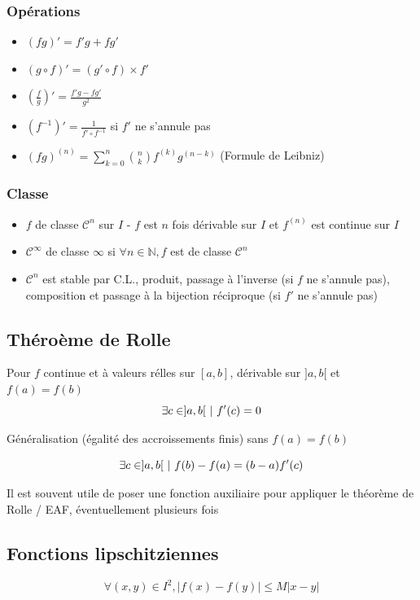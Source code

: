 \documentclass[openany]{book}
\begin{document}
\subsubsection{Opérations}
\begin{itemize}
    \item $ (fg)' = f'g + fg' $
    \item $ (g \circ f)' = (g' \circ f) \times f' $
    \item $ (\frac{f}{g})' = \frac{f'g - fg'}{g^2} $
    \item $ (f^{-1})' = \frac{1}{f' \circ f^{-1}} $ si $ f' $ ne s'annule pas
    \item $ (fg)^{(n)} = \sum_{k=0}^{n} \binom{n}{k} f^{(k)}g^{(n-k)} $ (Formule de Leibniz)
\end{itemize}

\subsubsection{Classe}

\begin{itemize}
    \item $f$ de classe $\mathcal{C}^n$ sur $I$ - $f$ est $n$ fois dérivable sur $I$ et $f^{(n)}$ est continue sur $I$
    \item $\mathcal{C}^\infty$ de classe $\infty$ si $\forall n \in \mathbb{N}, f$ est de classe $\mathcal{C}^n$
    \item $\mathcal{C}^n$ est stable par C.L., produit, passage à l'inverse (si $f$ ne s'annule pas), composition et passage à la bijection réciproque (si $f'$ ne s'annule pas)
\end{itemize}  

\subsection{Théroème de Rolle}
Pour $f$ continue et à valeurs rélles sur $[a, b]$, dérivable sur $]a, b[$ et $f(a) = f(b)$
\[\exists c \in ]a, b[ \text{ } | \text{ } f'(c) = 0\]

Généralisation (égalité des accroissements finis) sans $f(a) = f(b)$

\[\exists c \in ]a, b[ \text{ } | \text{ } f(b) - f(a) = (b-a)f'(c)\]

Il est souvent utile de poser une fonction auxiliaire pour appliquer le théorème de Rolle / EAF, éventuellement plusieurs fois

\subsection{Fonctions lipschitziennes}
\[ \forall (x, y) \in I^2, |f(x) - f(y)| \leq M |x-y| \]
\end{document}
